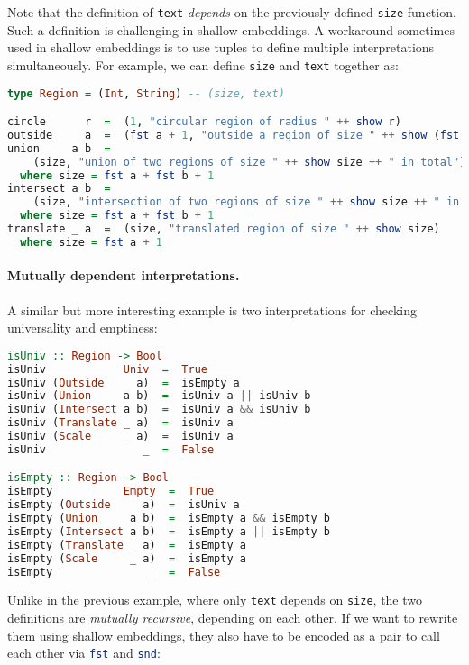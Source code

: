 \noindent
Note that the definition of \lstinline{text} \emph{depends} on the previously
defined \lstinline{size} function. Such a definition is challenging in shallow
embeddings. A workaround sometimes used in shallow embeddings is to use tuples
to define multiple interpretations simultaneously. For example, we can define
\lstinline{size} and \lstinline{text} together as:

\begin{lstlisting}[language=Haskell,deletekeywords={union,intersect}]
type Region = (Int, String) -- (size, text)

circle      r  =  (1, "circular region of radius " ++ show r)
outside     a  =  (fst a + 1, "outside a region of size " ++ show (fst a))
union     a b  =
    (size, "union of two regions of size " ++ show size ++ " in total")
  where size = fst a + fst b + 1
intersect a b  =
    (size, "intersection of two regions of size " ++ show size ++ " in total")
  where size = fst a + fst b + 1
translate _ a  =  (size, "translated region of size " ++ show size)
  where size = fst a + 1
\end{lstlisting}

\paragraph{Mutually dependent interpretations.} \label{sec:mutual}
A similar but more interesting example is two interpretations for checking
universality and emptiness:

\begin{lstlisting}[language=Haskell]
isUniv :: Region -> Bool
isUniv            Univ  =  True
isUniv (Outside     a)  =  isEmpty a
isUniv (Union     a b)  =  isUniv a || isUniv b
isUniv (Intersect a b)  =  isUniv a && isUniv b
isUniv (Translate _ a)  =  isUniv a
isUniv (Scale     _ a)  =  isUniv a
isUniv               _  =  False

isEmpty :: Region -> Bool
isEmpty           Empty  =  True
isEmpty (Outside     a)  =  isUniv a
isEmpty (Union     a b)  =  isEmpty a && isEmpty b
isEmpty (Intersect a b)  =  isEmpty a || isEmpty b
isEmpty (Translate _ a)  =  isEmpty a
isEmpty (Scale     _ a)  =  isEmpty a
isEmpty               _  =  False
\end{lstlisting}

\noindent
Unlike in the previous example, where only \lstinline{text} depends on
\lstinline{size}, the two definitions are \emph{mutually recursive}, depending
on each other. If we want to rewrite them using shallow embeddings, they also
have to be encoded as a pair to call each other via
\lstinline[language=Haskell]{fst} and \lstinline[language=Haskell]{snd}:

